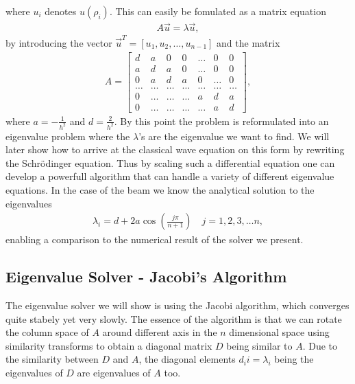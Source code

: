 \documentclass[twocolumn]{aastex62}
\begin{document}
where $u_i$ denotes $u(\rho_i)$. This can easily be fomulated as a matrix equation 
\begin{align}
	A\vec{u} = \lambda\vec{u},
	\label{eq:matrix_eq}
\end{align}
by introducing the vector $\vec{u}^T = [u_1, u_2, \ldots, u_{n-1}]$ and the matrix
\begin{align}
A = 
	\begin{bmatrix} 
	d& a & 0   & 0    & \dots  &0     & 0 \\
    a & d & a & 0    & \dots  &0     &0 \\
    0   & a & d & a  &0       &\dots & 0\\
    \dots  & \dots & \dots & \dots  &\dots      &\dots & \dots\\
    0   & \dots & \dots & \dots  &a  &d & a\\
   0   & \dots & \dots & \dots  &\dots       &a & d
    \end{bmatrix} ,
\end{align}
where $a = -\frac{1}{h^2}$ and $d = \frac{2}{h^2}$.
By this point the problem is reformulated into an eigenvalue problem where the $\lambda$'s are the eigenvalue we want to find. 
We will later show how to arrive at the classical wave equation on this form by rewriting the Schrödinger equation. Thus by scaling such a differential equation one can develop a powerfull algorithm that can handle a variety of different eigenvalue equations. In the case of the beam we know the analytical solution to the eigenvalues 
\begin{align}
	\lambda_i = d + 2a \cos\left(\frac{j\pi}{n+1}\right)\quad j = 1, 2, 3, \ldots n,
\end{align}
enabling a comparison to the numerical result of the solver we present. 

\subsection{Eigenvalue Solver - Jacobi's Algorithm}
The eigenvalue solver we will show is using the Jacobi algorithm, which converges quite stabely yet very slowly. The essence of the algorithm is that we can rotate the column space of $A$ around different axis in the $n$ dimensional space using similarity transforms to obtain a diagonal matrix $D$ being similar to $A$. Due to the similarity between $D$ and $A$, the diagonal elements $d_ii = \lambda_i$ being the eigenvalues of $D$ are eigenvalues of $A$ too.
\end{document}

